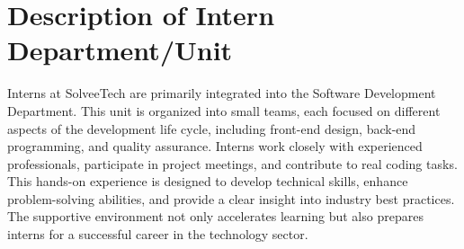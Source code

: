 \section{Description of Intern Department/Unit}
Interns at SolveeTech are primarily integrated into the Software Development Department. This unit is organized into small teams, each focused on different aspects of the development life cycle, including front-end design, back-end programming, and quality assurance. Interns work closely with experienced professionals, participate in project meetings, and contribute to real coding tasks. This hands-on experience is designed to develop technical skills, enhance problem-solving abilities, and provide a clear insight into industry best practices. The supportive environment not only accelerates learning but also prepares interns for a successful career in the technology sector.

